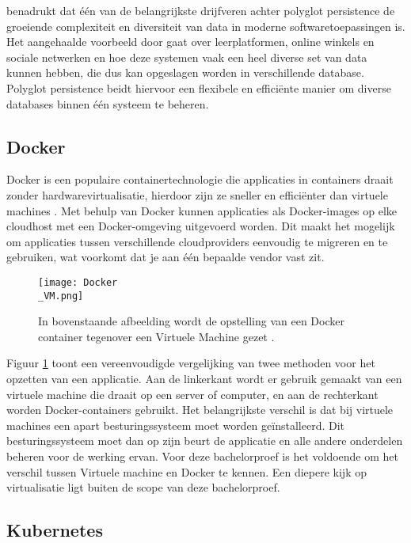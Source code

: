 \textcite{Candel2022} benadrukt dat één van de belangrijkste drijfveren achter polyglot persistence de groeiende complexiteit en diversiteit van data in moderne softwaretoepassingen is. Het aangehaalde voorbeeld door \textcite{Candel2022} gaat over leerplatformen, online winkels en sociale netwerken en hoe deze systemen vaak een heel diverse set van data kunnen hebben, die dus kan opgeslagen worden in verschillende database. Polyglot persistence beidt  hiervoor een flexibele en efficiënte manier om diverse databases binnen één systeem te beheren.

\subsection{Docker}

Docker is een populaire containertechnologie die applicaties in containers draait zonder hardwarevirtualisatie, hierdoor zijn ze sneller en efficiënter dan virtuele machines \autocite{Kim2022}. Met behulp van Docker kunnen applicaties als Docker-images op elke cloudhost met een Docker-omgeving uitgevoerd worden. Dit maakt het mogelijk om applicaties tussen verschillende cloudproviders eenvoudig te migreren en te gebruiken, wat voorkomt dat je aan één bepaalde vendor vast zit.

\begin{figure}[H]
	\centering
	\texttt{[image: Docker\\\_VM.png]}
	\caption[Voorstelling van Docker tegenover een Virtuele Machine]{\label{fig:Docker vs VM}In bovenstaande afbeelding wordt de opstelling van een Docker container tegenover een Virtuele Machine gezet \autocite{Kim2022}.}
\end{figure}

Figuur \ref{fig:Docker vs VM} toont een vereenvoudigde vergelijking van twee methoden voor het opzetten van een applicatie. Aan de linkerkant wordt er gebruik gemaakt van een virtuele machine die draait op een server of computer, en aan de rechterkant worden Docker-containers gebruikt. Het belangrijkste verschil is dat bij virtuele machines een apart besturingssysteem moet worden geïnstalleerd. Dit besturingssysteem moet dan op zijn beurt de applicatie en alle andere onderdelen beheren voor de werking ervan. Voor deze bachelorproef is het voldoende om het verschil tussen Virtuele machine en Docker te kennen. Een diepere kijk op virtualisatie ligt buiten de scope van deze bachelorproef.

\subsection{Kubernetes}

